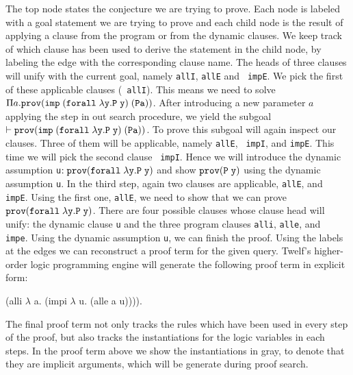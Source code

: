 \documentclass{acmconf}
\newcommand{\mygray}{\color{green}}
\newcommand{\pfLF}{\tt{prov}}
\newcommand{\impLF}{\tt{imp}\;}
\newcommand{\forallLF}{\tt{forall}\;}
\newcommand{\vd}{\vdash}
\begin{document}
The top node states the conjecture we are trying to prove. 
Each node is labeled with a goal statement we are trying to prove and
each child node is the result of applying a clause from the program or
from the dynamic clauses. We keep track of which clause has been used
to derive the statement in the child node, by labeling the edge with
the corresponding clause name. The heads of three clauses will unify
with the current goal, namely {\tt allI}, {\tt allE} and {\tt
  impE}. We pick the first of these applicable clauses ({\tt
  allI}). This means we need to solve $\Pi a. \pfLF ( \impLF
(\forallLF \lambda y. P\; y)\; (P a))$. After introducing a new
parameter $a$ applying the {} step in out search
procedure, we yield the subgoal $\vd \pfLF ( \impLF (\forallLF \lambda
y. P\; y)\; (P a))$. To prove this subgoal will again inspect our
clauses. Three of them will be applicable, namely {\tt allE}, {\tt
  impI}, and {\tt impE}. This time we will pick the second clause {\tt
  impI}. Hence we will introduce the dynamic assumption {\tt{u}}$ :
\pfLF (\forallLF \lambda y. P\; y)$ and show $\pfLF (P\; y)$ using the
dynamic assumption {\tt{u}}. In the third step, 
again two clauses are applicable,  {\tt allE}, and {\tt
  impE}. Using the first one, {\tt allE}, we need to show that we can
prove $\pfLF (\forallLF \lambda y. P\; y)$. There are four
possible clauses whose clause head will unify: the dynamic clause
{\tt u} and the three program clauses {\tt alli}, {\tt alle}, and {\tt
  impe}. Using the dynamic assumption {\tt u}, we can finish the
proof. Using the labels at the edges we can reconstruct a proof term
for the given query. Twelf's higher-order logic programming engine
will generate the following proof term in explicit form:

\begin{code}
(alli {\mygray{($\lambda\!\!$ x. ((forall $\lambda\!\!$ y. P y) imp P x))}}
   $\lambda\!\!$ a. (impi {\mygray{(forall $\lambda\!\!$ y.P y) (P a)}}
           $\lambda\!\!$ u. (alle {\mygray{($\lambda\!\!$ y.P y)}} a u)))).
\end{code}

The final proof term not only tracks the rules which have been used in
every step of the proof, but also tracks the instantiations for the logic
variables in each steps. In the proof term above we show the
instantiations in gray, to denote that they are implicit arguments,
which will be generate during proof search.
\end{document}
